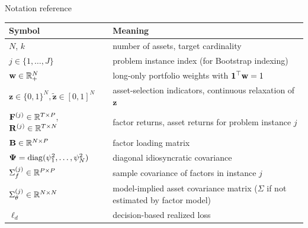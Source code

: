 \documentclass[10pt,aspectratio=169]{beamer}
\newcommand{\Nassets}{N}
\newcommand{\Kcard}{k}
\newcommand{\Wset}{\mathcal{W}}
\newcommand{\Param}{\theta}
\newcommand{\SigmaMat}{\Sigma}
\begin{document}
\begin{frame}{Notation reference}
  \centering\small
  \begin{tabular}{>{\raggedright\arraybackslash}p{.3\linewidth}p{.55\linewidth}}
    
    \toprule
    Symbol & Meaning \\
    \midrule
    $\Nassets$, $\Kcard$ & number of assets, target cardinality \\
    $j \in \{1,\dots, J\}$ & problem instance index (for Bootstrap indexing) \\
    $\mathbf{w}\in\RR_+^\Nassets$ & long-only portfolio weights with $\mathbf{1}^\top \mathbf{w}=1$ \\
    $\mathbf{z}\in\{0,1\}^\Nassets, \tilde{\mathbf{{z}}} \in [0,1]^\Nassets$ & asset-selection indicators, continuous relaxation of $\mathbf{z}$ \\
    $\mathbf{F}^{(j)} \in \mathbb{R}^{T \times P}$, $\mathbf{R}^{(j)} \in \RR^{T \times \Nassets}$ & factor returns, asset returns for problem instance $j$ \\
    $\mathbf{B}\in\RR^{\Nassets\times P}$ & factor loading matrix \\
    $\boldsymbol{\Psi}=\diag(\psi_1^2,\dots,\psi_\Nassets^2)$ & diagonal idiosyncratic covariance \\
    $\SigmaMat_f^{(j)} \in \RR^{P\times P}$ & sample covariance of factors in instance $j$ \\
    $\SigmaMat_\Param^{(j)} \in \RR^{\Nassets\times \Nassets}$ & model-implied asset covariance matrix ($\SigmaMat$ if not estimated by factor model) \\
    $\ell_d$ & decision-based realized loss \\
    \bottomrule
  \end{tabular}
\end{frame}


\end{document}
